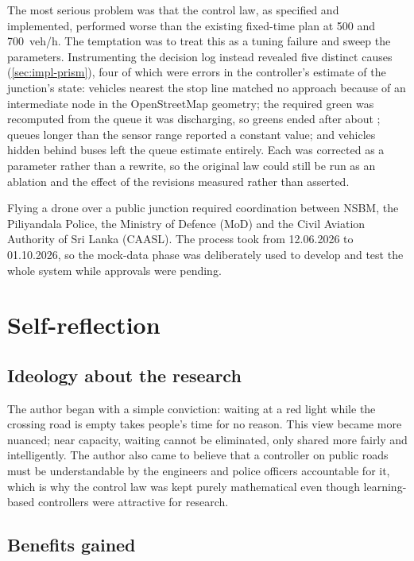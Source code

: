 {\begin{description}[leftmargin=0pt,style=unboxed]
\item[A controller that lost to the plan it replaced.] The most serious problem was that the control law, as specified and implemented, performed worse than the existing fixed-time plan at 500 and 700~veh/h. The temptation was to treat this as a tuning failure and sweep the parameters. Instrumenting the decision log instead revealed five distinct causes (\cref{sec:impl-prism}), four of which were errors in the controller's estimate of the junction's state: vehicles nearest the stop line matched no approach because of an intermediate node in the OpenStreetMap geometry; the required green was recomputed from the queue it was discharging, so greens ended after about ; queues longer than the sensor range reported a constant value; and vehicles hidden behind buses left the queue estimate entirely. Each was corrected as a parameter rather than a rewrite, so the original law could still be run as an ablation and the effect of the revisions measured rather than asserted.
\item[Permission lead time.] Flying a drone over a public junction required coordination between NSBM, the Piliyandala Police, the Ministry of Defence (MoD) and the Civil Aviation Authority of Sri Lanka (CAASL). The process took from 12.06.2026 to 01.10.2026, so the mock-data phase was deliberately used to develop and test the whole system while approvals were pending.
\end{description}}

\section{Self-reflection}

\subsection{Ideology about the research}

The author began with a simple conviction: waiting at a red light while the crossing road is empty takes people's time for no reason. This view became more nuanced; near capacity, waiting cannot be eliminated, only shared more fairly and intelligently. The author also came to believe that a controller on public roads must be understandable by the engineers and police officers accountable for it, which is why the control law was kept purely mathematical even though learning-based controllers were attractive for research.

\subsection{Benefits gained}

